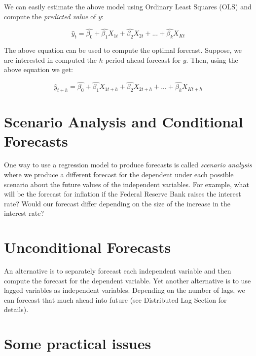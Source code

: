 \documentclass[]{book}
\theoremstyle{definition}
\theoremstyle{definition}
\theoremstyle{definition}
\theoremstyle{remark}
\begin{document}
We can easily estimate the above model using Ordinary Least Squares
(OLS) and compute the \emph{predicted value} of \(y\):

\begin{equation}
    \widehat{y}_t = \widehat{\beta_0} +\widehat{\beta_1} X_{1t} +\widehat{\beta_2} X_{2t}+...+ \widehat{\beta_k} X_{Kt}
  \end{equation}

The above equation can be used to compute the optimal forecast. Suppose,
we are interested in computed the \(h\) period ahead forecast for \(y\).
Then, using the above equation we get:

\begin{equation}
        \widehat{y}_{t+h} =  \widehat{\beta_0} +\widehat{\beta_1} X_{1t+h} +\widehat{\beta_2} X_{2t+h}+...+ \widehat{\beta_k} X_{Kt+h}
    \end{equation}

\section{Scenario Analysis and Conditional
Forecasts}\label{scenario-analysis-and-conditional-forecasts}

One way to use a regression model to produce forecasts is called
\emph{scenario analysis} where we produce a different forecast for the
dependent under each possible scenario about the future values of the
independent variables. For example, what will be the forecast for
inflation if the Federal Reserve Bank raises the interest rate? Would
our forecast differ depending on the size of the increase in the
interest rate?

\section{Unconditional Forecasts}\label{unconditional-forecasts}

An alternative is to separately forecast each independent variable and
then compute the forecast for the dependent variable. Yet another
alternative is to use lagged variables as independent variables.
Depending on the number of lags, we can forecast that much ahead into
future (see Distributed Lag Section for details).

\section{Some practical issues}\label{some-practical-issues}
\end{document}
